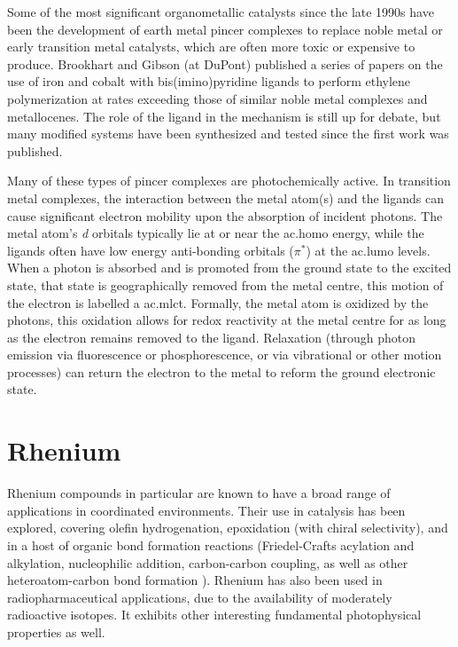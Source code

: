 Some of the most significant organometallic catalysts since the late 1990s have been the development of earth metal pincer complexes to replace noble metal or early transition metal catalysts, which are often more toxic or expensive to produce. Brookhart and Gibson (at DuPont) published a series of papers\autocite{small1998a, small1998b, britovsek1998, britovsek1999} on the use of iron and cobalt with bis(imino)pyridine ligands to perform ethylene polymerization at rates exceeding those of similar noble metal complexes and metallocenes\autocite{gibson2007}. The role of the ligand in the mechanism is still up for debate, but many modified systems have been synthesized and tested since the first work was published\autocite{boudier2014}.

Many of these types of pincer complexes are photochemically active. In transition metal complexes, the interaction between the metal atom(s) and the ligands can cause significant electron mobility upon the absorption of incident photons. The metal atom's \textit{d} orbitals typically lie at or near the \gls{ac.homo} energy, while the ligands often have low energy anti-bonding orbitals ($\pi^\ast$) at the \gls{ac.lumo} levels. When a photon is absorbed and is promoted from the ground state to the excited state, that state is geographically removed from the metal centre, this motion of the electron is labelled a \gls{ac.mlct}. Formally, the metal atom is oxidized by the photons, this oxidation allows for redox reactivity at the metal centre for as long as the electron remains removed to the ligand. Relaxation (through photon emission via fluorescence or phosphorescence, or via vibrational or other motion processes) can return the electron to the metal to reform the ground electronic state. 


\section{Rhenium}

Rhenium compounds in particular are known to have a broad range of applications in coordinated environments. Their use in catalysis has been explored, covering olefin hydrogenation\autocite{dudle2011}, epoxidation (with chiral selectivity)\autocite{jain2008}, and in a host of organic bond formation reactions\autocite{kuninobu2011} (Friedel-Crafts acylation and alkylation\autocite{kusama1995, nishiyama2000, kuninobu2009}, nucleophilic addition\autocite{bolm2001, zhao2007}, carbon-carbon coupling\autocite{kawata2009, hori2000}, as well as other heteroatom-carbon bond formation \autocite{hua2004, adams1994, adams1996, zhao2006, muller2000}). Rhenium has also been used in radiopharmaceutical applications, due to the availability of moderately radioactive isotopes\autocite{bartholoma2009, schibli2002}. It exhibits other interesting fundamental photophysical properties as well\autocite{coogan2009}. 

